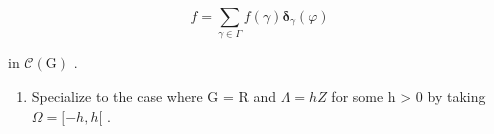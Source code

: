 \[
f = \sum_ {\gamma \in \Gamma} f (\gamma) \boldsymbol {\delta} _ {\gamma} (\varphi)
\]

in \(\mathcal{C}(\mathrm{G})\) .

\begin{enumerate}
\def\labelenumi{\alph{enumi})}
\setcounter{enumi}{5}
\tightlist
\item
  Specialize to the case where G = R and \(\Lambda = hZ\) for some h \textgreater{} 0 by taking \(\Omega = [-h, h[\) .
\end{enumerate}

